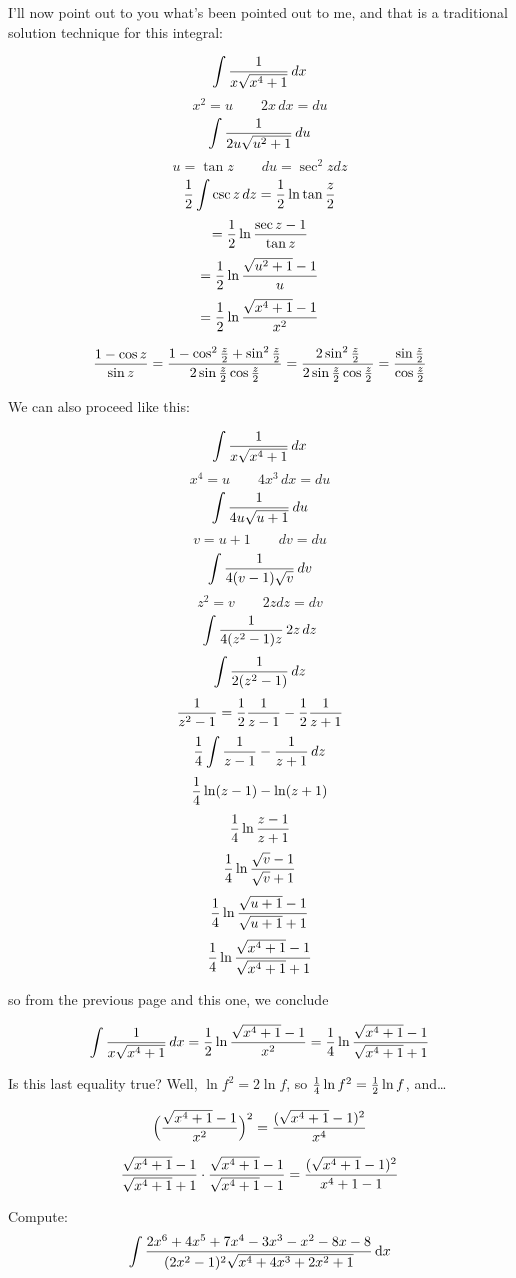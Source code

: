 I'll now point out to you what's been pointed out to me, and that is a
traditional solution technique for this integral:

$$\int {1\over{x\sqrt{x^4+1}}} \, dx$$
$$x^2 = u \qquad 2 x\, dx = du$$
$$\int {1\over{2u\sqrt{u^2+1}}} \, du$$
$$u = \tan z \qquad du = \sec^2 z dz$$
$${1 \over 2} \int \csc z \, dz = {1\over 2} \ln \tan {z\over2}$$
$$={1\over2} \ln {{\sec z - 1}\over{\tan z}}$$
$$={1\over2} \ln {{\sqrt{u^2+1}-1}\over{u}}$$
$$={1\over2} \ln {{\sqrt{x^4+1}-1}\over{x^2}}$$

\vskip 0.5in

$${{1 - \cos z}\over{\sin z}} = {{1 - \cos^2 {z\over2} + \sin^2 {z\over2}}\over{2\sin{z\over2}\cos{z\over2}}} = {{2\sin^2 {z\over2}}\over{2\sin{z\over2}\cos{z\over2}}} = {{\sin {z\over2}}\over{\cos{z\over2}}} $$

\vfill\eject

We can also proceed like this:

$$\int {1\over{x\sqrt{x^4+1}}} \, dx$$
$$x^4 = u \qquad 4 x^3\, dx = du$$
$$\int {1\over{4u\sqrt{u+1}}} \, du$$
$$v = u + 1 \qquad dv = du$$
$$\int {1\over{4(v-1)\sqrt{v}}} \, dv$$
$$z^2 = v \qquad 2 z dz = dv$$
$$\int {1\over{4(z^2-1)z}} \, 2z\, dz$$
$$\int {1\over{2(z^2-1)}} \, dz$$
$${1\over{z^2-1}} = {1\over2}{1\over{z-1}} - {1\over2}{1\over{z+1}}$$
$${1\over4} \int {1\over{z-1}} - {1\over{z+1}} \, dz$$
$${1\over4} \ln (z-1) - \ln (z+1)$$
$${1\over4} \ln {{z-1}\over{z+1}}$$
$${1\over4} \ln {{\sqrt{v}-1}\over{\sqrt{v}+1}}$$
$${1\over4} \ln {{\sqrt{u+1}-1}\over{\sqrt{u+1}+1}}$$
$${1\over4} \ln {{\sqrt{x^4+1}-1}\over{\sqrt{x^4+1}+1}}$$

so from the previous page and this one, we conclude

$$\int {1\over{x\sqrt{x^4+1}}} \, dx
={1\over2} \ln {{\sqrt{x^4+1}-1}\over{x^2}}
={1\over4} \ln {{\sqrt{x^4+1}-1}\over{\sqrt{x^4+1}+1}}$$

Is this last equality true?  Well, $\ln f^2 = 2\ln f$, so
${1\over4}\ln f^2 = {1\over2}\ln f$, and\ldots

$$\Big({{\sqrt{x^4+1}-1}\over{x^2}}\Big)^2
= {{(\sqrt{x^4+1}-1)^2}\over{x^4}}$$

$${{\sqrt{x^4+1}-1}\over{\sqrt{x^4+1}+1}} \cdot
{{\sqrt{x^4+1}-1}\over{\sqrt{x^4+1}-1}}
= {{(\sqrt{x^4+1}-1)^2}\over{x^4+1-1}}$$




\endexample

\vfill\eject
{}

\example Compute:
\label{Chebyshev's Integral}
$$\int {{2x^6+4x^5+7x^4-3x^3-x^2-8x-8}\over{(2x^2-1)^2\sqrt{x^4+4 x^3+2 x^2+1}}} \,{\rm d}x$$

